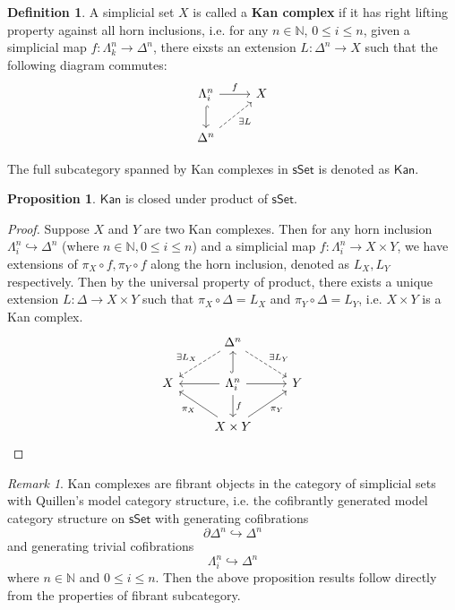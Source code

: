 \documentclass{article}
\theoremstyle{definition}
\newtheorem{mydef}{Definition}[section]
\newtheorem{prop}{Proposition}[section]
\theoremstyle{remark}
\newtheorem*{remark}{Remark}
\begin{document}
\begin{mydef}

A simplicial set $X$ is called a \textbf{Kan complex} if it has right lifting property against all horn inclusions, i.e. for any $n \in \mathbb{N}$, $ 0 \leq i \leq n$, given a simplicial map $f: \Lambda^n_k \to \Delta^n$, there eixsts an extension $L: \Delta^n \to X$  such that the following diagram commutes:
$$ \begin{tikzcd} \Lambda^n_i \arrow[d, hook] \arrow[r,"f"] & X \\ \Delta^n \arrow[ru, "\exists L"', dashed] \end{tikzcd} $$

The full subcategory spanned by Kan complexes in $\mathsf{sSet}$ is denoted as $\mathsf{Kan}$.

\end{mydef}

\begin{prop}
$\mathsf{Kan}$ is closed under product of $\mathsf{sSet}$.
\end{prop}

\begin{proof}
Suppose $X$ and $Y$ are two Kan complexes. Then for any horn inclusion $\Lambda^n_i \hookrightarrow \Delta^n$ (where $n \in \mathbb{N}, 0 \leq i \leq n$) and a simplicial map $f:\Lambda^n_i \to X \times Y$, we have extensions of $\pi_X \circ f,\pi_Y \circ f$ along the horn inclusion, denoted as $L_X,L_Y$ respectively. Then by the universal property of product, there exists a unique extension $L: \Delta \to X \times Y$ such that $\pi_X \circ \Delta = L_X$ and $\pi_Y \circ \Delta = L_Y$, i.e. $X \times Y$ is a Kan complex. $$ \begin{tikzcd} & \Delta^n \arrow[ld, "\exists L_X"', dashed] \arrow[rd, "\exists L_Y", dashed] &   \\ X & \Lambda^n_i \arrow[d, "f"] \arrow[l] \arrow[r] \arrow[u, hook] & Y \\ & X \times Y \arrow[lu, "\pi_X"] \arrow[ru, "\pi_Y"'] & \end{tikzcd} $$

\end{proof}

\begin{remark}
Kan complexes are fibrant objects in the category of simplicial sets with Quillen's model category structure, i.e. the cofibrantly generated model category structure on $\mathsf{sSet}$ with generating cofibrations $$ \partial \Delta^n \hookrightarrow \Delta^n $$ and generating trivial cofibrations $$ \Lambda^n_i \hookrightarrow \Delta^n$$ where $n \in \mathbb{N}$ and $ 0 \leq i \leq n$. Then the above proposition results follow directly from the properties of fibrant subcategory.
\end{remark}
\end{document}
